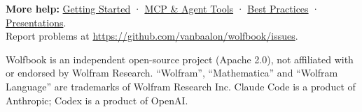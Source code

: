 \documentclass[11pt,a4paper]{article}
\begin{document}
\vspace{1em}
\textbf{More help:} \href{https://github.com/vanbaalon/wolfbook/blob/main/docs/getting-started.md}{Getting Started} ·
\href{https://github.com/vanbaalon/wolfbook/blob/main/docs/mcp-and-agent-tools.md}{MCP \& Agent Tools} ·
\href{https://github.com/vanbaalon/wolfbook/blob/main/docs/best-practices.md}{Best Practices} ·
\href{https://github.com/vanbaalon/wolfbook/blob/main/docs/presentations.md}{Presentations}.\\
Report problems at \url{https://github.com/vanbaalon/wolfbook/issues}.

\vfill
{\footnotesize\color{wbgrey} Wolfbook is an independent open-source project (Apache 2.0), not affiliated with or endorsed by Wolfram Research. ``Wolfram'', ``Mathematica'' and ``Wolfram Language'' are trademarks of Wolfram Research Inc. Claude Code is a product of Anthropic; Codex is a product of OpenAI.}
\end{document}
